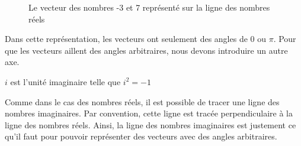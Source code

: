 \begin{figure}[!htbp]
    \begin{center}
        \def\numberLineLastNumber{7}
    \end{center}
    \caption{Le vecteur des nombres -3 et 7 représenté sur la ligne des nombres réels}
\end{figure}
\begin{remark}
    Dans cette représentation, les vecteurs ont seulement des angles de 0 ou $\pi$. Pour que les vecteurs aillent des angles arbitraires, nous devons introduire un autre axe.
\end{remark}
\begin{definition}
    $i$ est l'unité imaginaire telle que $i^2 = -1$
\end{definition}
Comme dans le cas des nombres réels, il est possible de tracer une ligne des nombres imaginaires. Par convention, cette ligne est tracée perpendiculaire à la ligne des nombres réels. Ainsi, la ligne des nombres imaginaires est justement ce qu'il faut pour pouvoir représenter des vecteurs avec des angles arbitraires.
